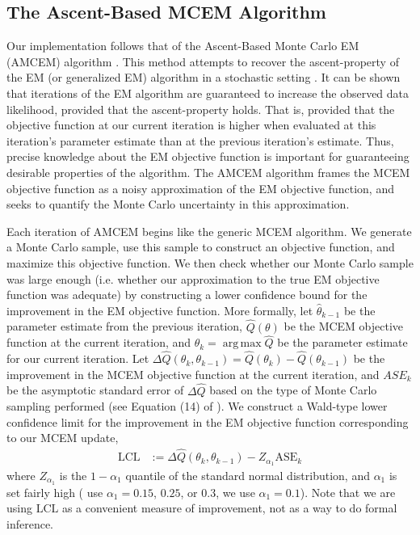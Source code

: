\documentclass[11pt, oneside]{article}   	%
\DeclareMathOperator*{\argmax}{arg\,max}
\begin{document}


\subsection{The Ascent-Based MCEM Algorithm}
\label{sec:AMCEM}

Our implementation follows that of the Ascent-Based Monte Carlo EM (AMCEM) algorithm \citep{Caf05}. This method attempts to recover the ascent-property of the EM (or generalized EM) algorithm in a stochastic setting \citep{McL08}. It can be shown that iterations of the EM algorithm are guaranteed to increase the observed data likelihood, provided that the ascent-property holds. That is, provided that the objective function at our current iteration is higher when evaluated at this iteration's parameter estimate than at the previous iteration's estimate. Thus, precise knowledge about the EM objective function is important for guaranteeing desirable properties of the algorithm. The AMCEM algorithm frames the MCEM objective function as a noisy approximation of the EM objective function, and seeks to quantify the Monte Carlo uncertainty in this approximation. 

Each iteration of AMCEM begins like the generic MCEM algorithm. We generate a Monte Carlo sample, use this sample to construct an objective function, and maximize this objective function. We then check whether our Monte Carlo sample was large enough (i.e. whether our approximation to the true EM objective function was adequate) by constructing a lower confidence bound for the improvement in the EM objective function. More formally, let $\hat{\theta}_{k-1}$ be the parameter estimate from the previous iteration, $\hat{Q}(\theta)$ be the MCEM objective function at the current iteration, and $\hat{\theta}_k = \argmax \hat{Q}$ be the parameter estimate for our current iteration. Let $\Delta \hat{Q}(\theta_k, \theta_{k-1}) = \hat{Q}(\theta_k) - \hat{Q}(\theta_{k-1})$ be the improvement in the MCEM objective function at the current iteration, and $ASE_k$ be the asymptotic standard error of $\Delta \hat{Q}$ based on the type of Monte Carlo sampling performed (see Equation (14) of \citealp{Caf05}). We construct a Wald-type lower confidence limit for the improvement in the EM objective function corresponding to our MCEM update, 
%
\begin{align}
	\mathrm{LCL} &:= \Delta \hat{Q}(\theta_k, \theta_{k-1}) - Z_{\alpha_1} \mathrm{ASE}_k \label{eq:Caf_LCL}
\end{align}
where $Z_{\alpha_1}$ is the $1 - \alpha_1$ quantile of the standard normal distribution, and $\alpha_1$ is set fairly high (\citeauthor{Caf05} use $\alpha_1 = 0.15$, $0.25$, or $0.3$, we use $\alpha_1 = 0.1$). Note that we are using $\mathrm{LCL}$ as a convenient measure of improvement, not as a way to do formal inference.
\end{document}
